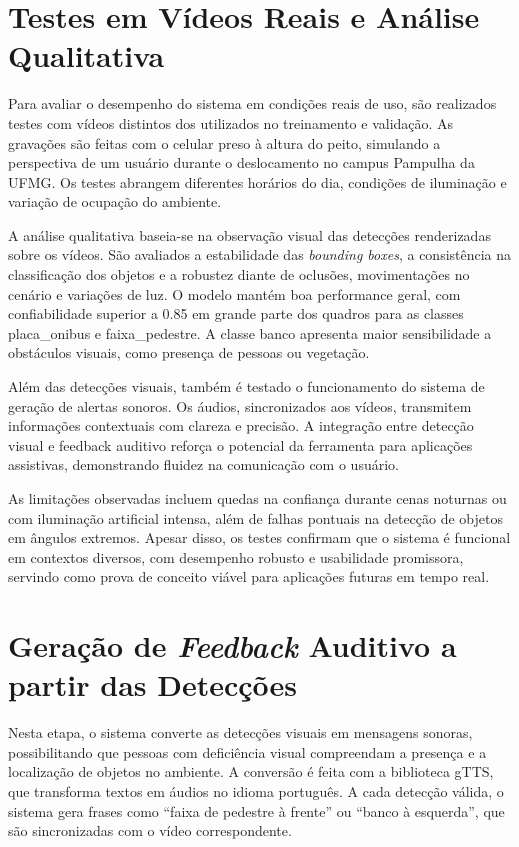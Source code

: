 \section{Testes em Vídeos Reais e Análise Qualitativa}

Para avaliar o desempenho do sistema em condições reais de uso, são realizados testes com vídeos distintos dos utilizados no treinamento e validação. As gravações são feitas com o celular preso à altura do peito, simulando a perspectiva de um usuário durante o deslocamento no campus Pampulha da UFMG. Os testes abrangem diferentes horários do dia, condições de iluminação e variação de ocupação do ambiente.

A análise qualitativa baseia-se na observação visual das detecções renderizadas sobre os vídeos. São avaliados a estabilidade das \textit{bounding boxes}, a consistência na classificação dos objetos e a robustez diante de oclusões, movimentações no cenário e variações de luz. O modelo mantém boa performance geral, com confiabilidade superior a 0.85 em grande parte dos quadros para as classes placa\_onibus e faixa\_pedestre. A classe banco apresenta maior sensibilidade a obstáculos visuais, como presença de pessoas ou vegetação.

Além das detecções visuais, também é testado o funcionamento do sistema de geração de alertas sonoros. Os áudios, sincronizados aos vídeos, transmitem informações contextuais com clareza e precisão. A integração entre detecção visual e feedback auditivo reforça o potencial da ferramenta para aplicações assistivas, demonstrando fluidez na comunicação com o usuário.

As limitações observadas incluem quedas na confiança durante cenas noturnas ou com iluminação artificial intensa, além de falhas pontuais na detecção de objetos em ângulos extremos. Apesar disso, os testes confirmam que o sistema é funcional em contextos diversos, com desempenho robusto e usabilidade promissora, servindo como prova de conceito viável para aplicações futuras em tempo real.

\section{Geração de \textit{Feedback} Auditivo a partir das Detecções}

Nesta etapa, o sistema converte as detecções visuais em mensagens sonoras, possibilitando que pessoas com deficiência visual compreendam a presença e a localização de objetos no ambiente. A conversão é feita com a biblioteca gTTS, que transforma textos em áudios no idioma português. A cada detecção válida, o sistema gera frases como “faixa de pedestre à frente” ou “banco à esquerda”, que são sincronizadas com o vídeo correspondente.

